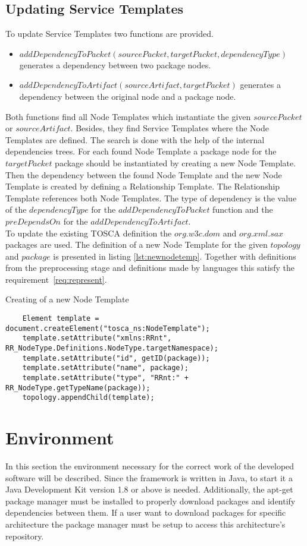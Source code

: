 \subsection*{Updating Service Templates}
To update Service Templates two functions are provided.
\begin{itemize}
	\item $addDependencyToPacket(sourcePacket, targetPacket, dependencyType)$ generates a dependency between two package nodes.
	\item $addDependencyToArtifact(sourceArtifact, targetPacket)$ generates a dependency between the original node and a package node.
\end{itemize} 
Both functions find all Node Templates which instantiate the given $sourcePacket$ or $sourceArtifact$.
Besides, they find Service Templates where the Node Templates are defined.
The search is done with the help of the internal dependencies trees.
For each found Node Template a package node for the $targetPacket$ package should be instantiated by creating a new Node Template.
Then the dependency between the found Node Template and the new Node Template is created by defining a Relationship Template.
The Relationship Template references both Node Templates. 
The type of dependency is the value of the $dependencyType$ for the $addDependencyToPacket$ function and the $preDependsOn$ for the $addDependencyToArtifact$.\\
To update the existing TOSCA definition the $org$.$w3c$.$dom$ and $org$.$xml$.$sax$ packages are used. 
The definition of a new Node Template for the given $topology$ and $package$ is presented in listing \ref{lst:newnodetemp}.
Together with definitions from the preprocessing stage and definitions made by languages this satisfy the requirement~\ref{req:represent}. 
\begin{Listing}
	\caption{Creating of a new Node Template}
	\label{lst:newnodetemp}
	\begin{lstlisting}  
	Element template = document.createElement("tosca_ns:NodeTemplate");
	template.setAttribute("xmlns:RRnt", RR_NodeType.Definitions.NodeType.targetNamespace);
	template.setAttribute("id", getID(package));
	template.setAttribute("name", package);
	template.setAttribute("type", "RRnt:" + RR_NodeType.getTypeName(package));
	topology.appendChild(template);
	\end{lstlisting}
\end{Listing}

\section{Environment}
In this section the environment necessary for the correct work of the developed software will be described.
Since the framework is written in Java, to start it a Java Development Kit version 1.8 or above is needed.
Additionally, the apt-get package manager must be installed to properly download packages and identify dependencies between them. 
If a user want to download packages for specific architecture the package manager must be setup to access this architecture's repository. 